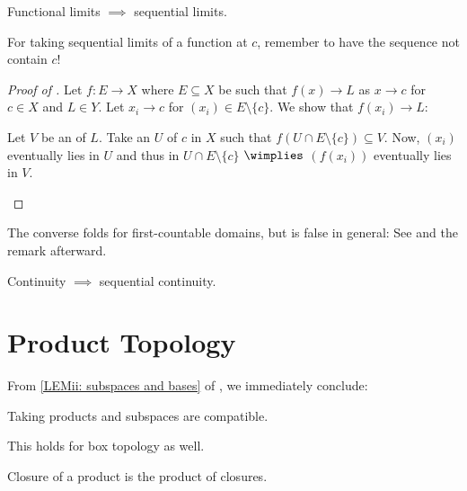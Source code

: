 	
	\begin{lem}\label{LEM: func lim => seq lims}
		Functional limits $\implies$ sequential limits.
	\end{lem}
	
	\begin{rmk}
		For taking sequential limits of a function at $c$, remember to have the sequence not contain $c$!
	\end{rmk}
	
	\begin{proof}[Proof of ]
		Let $f\colon E\to X$ where $E\subseteq X$ be such that $f(x)\to L$ as $x\to c$ for $c\in X$ and $L\in Y$. Let $x_i\to c$ for $(x_i)\in E\setminus\{c\}$. We show that $f(x_i)\to L$:
		\begin{subproof}
			Let $V$ be an \onbd of $L$. Take an \onbd $U$ of $c$ in $X$ such that $f(U\cap E\setminus\{c\})\subseteq V$. Now, $(x_i)$ eventually lies in $U$ and thus in $U\cap E\setminus\{c\}$ $\wimplies$ $(f(x_i))$ eventually lies in $V$.
		\end{subproof}
	\end{proof}
	
	\begin{rmk}
		The converse folds for first-countable domains, but is false in general: See  and the remark afterward.
	\end{rmk}
	
	\begin{cor}
		Continuity $\implies$ sequential continuity.
	\end{cor}





\section{Product Topology}

	From \ref{LEMii: subspaces and bases} of , we immediately conclude:

	\begin{lem}
		Taking products and subspaces are compatible.
	\end{lem}
	
	\begin{rmk}
		This holds for box topology as well.
	\end{rmk}
	
	\begin{lem}
		Closure of a product is the product of closures.
	\end{lem}
	
